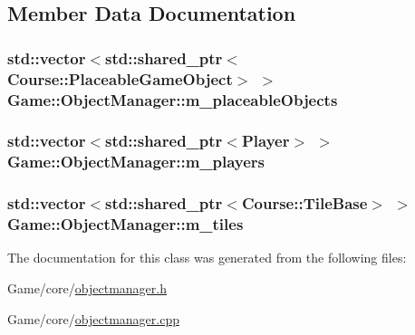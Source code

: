 \subsection{Member Data Documentation}
\hypertarget{classGame_1_1ObjectManager_abba2ff9bea647e526ef9a556ebbbcdbe}{
\subsubsection[{m\-\_\-placeable\-Objects}]{\setlength{\rightskip}{0pt plus 5cm}std\-::vector$<$std\-::shared\-\_\-ptr$<${\bf Course\-::\-Placeable\-Game\-Object}$>$ $>$ Game\-::\-Object\-Manager\-::m\-\_\-placeable\-Objects\hspace{0.3cm}{\ttfamily [private]}}}\label{classGame_1_1ObjectManager_abba2ff9bea647e526ef9a556ebbbcdbe}
\hypertarget{classGame_1_1ObjectManager_ae4c88baa0dec114607b47da932b03243}{
\subsubsection[{m\-\_\-players}]{\setlength{\rightskip}{0pt plus 5cm}std\-::vector$<$std\-::shared\-\_\-ptr$<${\bf Player}$>$ $>$ Game\-::\-Object\-Manager\-::m\-\_\-players\hspace{0.3cm}{\ttfamily [private]}}}\label{classGame_1_1ObjectManager_ae4c88baa0dec114607b47da932b03243}
\hypertarget{classGame_1_1ObjectManager_a814f7a4ef4201c5627c0ae77a4a3dec1}{
\subsubsection[{m\-\_\-tiles}]{\setlength{\rightskip}{0pt plus 5cm}std\-::vector$<$std\-::shared\-\_\-ptr$<${\bf Course\-::\-Tile\-Base}$>$ $>$ Game\-::\-Object\-Manager\-::m\-\_\-tiles\hspace{0.3cm}{\ttfamily [private]}}}\label{classGame_1_1ObjectManager_a814f7a4ef4201c5627c0ae77a4a3dec1}


The documentation for this class was generated from the following files\-:\begin{DoxyCompactItemize}
\item 
Game/core/\hyperlink{objectmanager_8h}{objectmanager.\-h}\item 
Game/core/\hyperlink{objectmanager_8cpp}{objectmanager.\-cpp}\end{DoxyCompactItemize}
